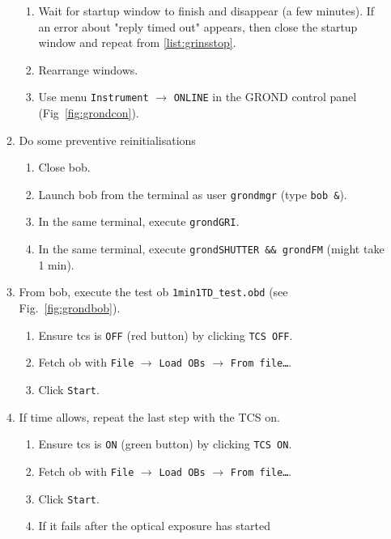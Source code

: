 \documentclass[11pt,fleqn]{book} %
\begin{document}
\begin{enumerate}
\begin{enumerate}
\begin{enumerate}
            \item Wait for startup window to finish and disappear (a few minutes). If an error about "reply timed out" appears, then close the startup window and repeat from \ref{list:grinsstop}. \label{list:grinsstart}
            \item Rearrange windows.
            \item Use menu \texttt{Instrument} $\rightarrow$ \texttt{ONLINE} in the GROND control panel (Fig~\ref{fig:grondcon}).
                 \label{list:grondonline}
         \end{enumerate}
         \item Do some preventive reinitialisations
           \begin{enumerate}
             \item Close \gls{bob}.
             \item Launch \gls{bob} from the terminal as user \texttt{grondmgr} (type \texttt{bob \&}).
             \item In the same terminal, execute \texttt{grondGRI}.
             \item In the same terminal, execute \texttt{grondSHUTTER \&\& grondFM} (might take 1 min).
           \end{enumerate}
         \item From \gls{bob}, execute the test \gls{ob} \texttt{1min1TD\_test.obd} (see Fig.~\ref{fig:grondbob}).
           \begin{enumerate}
             \item Ensure \gls{tcs} is \texttt{OFF} (red button) by clicking \texttt{TCS OFF}.
             \item Fetch \gls{ob} with \texttt{File} $\rightarrow$  \texttt{Load OBs} $\rightarrow$ \texttt{From file…}.
             \item Click \texttt{Start}.
           \end{enumerate}
         \item If time allows, repeat the last step with the TCS on.
           \begin{enumerate}
             \item Ensure \gls{tcs} is \texttt{ON} (green button) by clicking \texttt{TCS ON}.
             \item Fetch \gls{ob} with \texttt{File} $\rightarrow$  \texttt{Load OBs} $\rightarrow$ \texttt{From file…}.
             \item Click \texttt{Start}.
             \item If it fails after the optical exposure has started

\end{enumerate}
\end{enumerate}
\end{enumerate}
\end{document}
